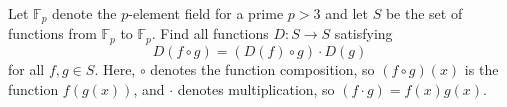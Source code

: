 Let $\mathbb{F}_{p}$ denote the $p$-element field for a prime $p>3$ and let $S$ be the set of functions from $\mathbb{F}_{p}$ to $\mathbb{F}_{p}$. Find all functions  $D\colon S\to S$ satisfying
\[D(f\circ g)=(D(f)\circ g)\cdot D(g)\]for all $f,g \in {S}$. Here, $\circ$ denotes the function composition, so $(f\circ g)(x)$ is the function $f(g(x))$, and $\cdot$ denotes multiplication, so $(f\cdot g)=f(x)g(x)$.